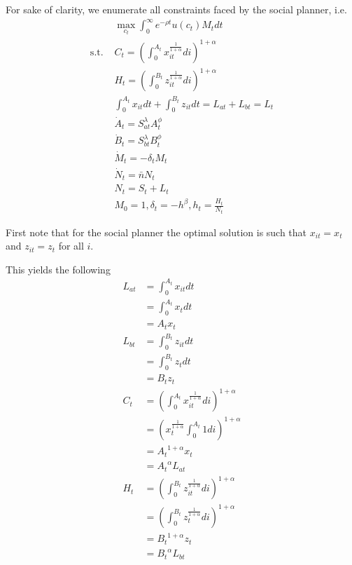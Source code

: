 \documentclass[12pt]{article}
\newcommand{\1}{{\bf 1}} %
\DeclareMathOperator{\subjectto}{{s.t.\ }} %
\begin{document}
\begin{enumerate}[(1)]
	For sake of clarity, we enumerate all constraints faced by the social planner, i.e.
	\begin{align*}
		&\max_{c_t} \int_{0}^{\infty}e^{-\rho t}u(c_t)M_tdt\\
		\subjectto & C_t = \left( \int_{0}^{A_t}x_{it}^{\frac{1}{1+\alpha}}di\right) ^{1+\alpha}\\
		& H_t = \left( \int_{0}^{B_t}z_{it}^{\frac{1}{1+\alpha}}di\right) ^{1+\alpha}\\
		& \int_{0}^{A_t}x_{it}dt+  \int_{0}^{B_t}z_{it}dt = L_{at}+ L_{bt}=L_t\\
		& \dot{A}_t = S_{at}^\lambda A_t^\phi\\
		& \dot{B}_t = S_{bt}^\lambda B_t^\phi\\	
		& \dot{M}_t = -\delta_tM_t\\
		& \dot{N}_t = \bar{n}N_t\\
		& N_t = S_t+L_t\\
		& M_0 = 1, \delta_t = -h^\beta, h_t = \frac{H_t}{N_t}
	\end{align*}
	
	First note that for the social planner the optimal solution is such that $x_{it}=x_t$ and $z_{it}=z_t$ for all $i$.
	
	This yields the following 
		\begin{align*}
		 L_{at} &=  \int_{0}^{A_t}x_{it}dt\\
		 &=  \int_{0}^{A_t}x_{t}dt\\
		 &=  A_tx_{t}\\
		 L_{bt} &= \int_{0}^{B_t}z_{it}dt \\
		 &= \int_{0}^{B_t}z_{t}dt \\
		 & = B_t z_{t}\\
		 C_t & = \left( \int_{0}^{A_t}x_{it}^{\frac{1}{1+\alpha}}di\right) ^{1+\alpha}\\
		 & = \left(x_{t}^{\frac{1}{1+\alpha}} \int_{0}^{A_t}1di\right) ^{1+\alpha}\\
		 & = {A_t}^{1+\alpha}x_{t}\\
		 & = {A_t}^{\alpha} L_{at}\\
		 H_t &= \left( \int_{0}^{B_t}z_{it}^{\frac{1}{1+\alpha}}di\right) ^{1+\alpha}\\
		 &= \left( \int_{0}^{B_t}z_{t}^{\frac{1}{1+\alpha}}di\right) ^{1+\alpha}\\
		 		 & = {B_t}^{1+\alpha}z_{t}\\
		 & = {B_t}^{\alpha} L_{bt}
	\end{align*}
	

\end{enumerate}
\end{document}
